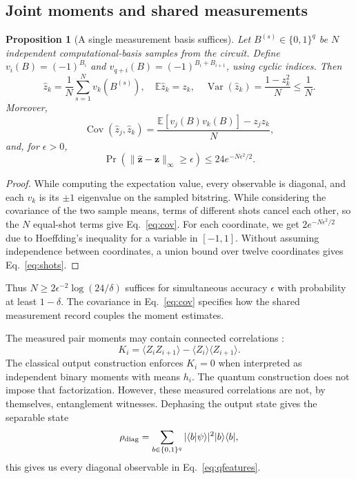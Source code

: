\documentclass[10pt,a4paper]{article}
\newtheorem{proposition}{Proposition}
\newcommand{\E}{\mathbb{E}}
\newcommand{\Var}{\operatorname{Var}}
\newcommand{\Cov}{\operatorname{Cov}}
\newcommand{\ket}[1]{\lvert #1\rangle}
\newcommand{\bra}[1]{\langle #1\rvert}
\newcommand{\norm}[1]{\lVert #1\rVert}
\begin{document}
\subsection{Joint moments and shared measurements}
\begin{proposition}[A single measurement basis suffices]\label{prop:shots}
Let $B^{(s)}\in\{0,1\}^{q}$ be $N$ independent computational-basis samples from the circuit. Define $v_i(B)=(-1)^{B_i}$ and $v_{q+i}(B)=(-1)^{B_i+B_{i+1}}$, using cyclic indices. Then
\begin{equation}
\widehat z_k=\frac1N\sum_{s=1}^{N}v_k(B^{(s)}),\quad
\E\widehat z_k=z_k,\quad
\Var(\widehat z_k)=\frac{1-z_k^2}{N}\leq\frac1N.
\end{equation}
Moreover,
\begin{equation}\label{eq:cov}
\Cov(\widehat z_j,\widehat z_k)
=\frac{\E[v_j(B)v_k(B)]-z_jz_k}{N},
\end{equation}
and, for $\epsilon>0$,
\begin{equation}\label{eq:shots}
\Pr\!\left(\norm{\widehat{\mathbf z}-\mathbf z}_\infty\geq\epsilon\right)
\leq24e^{-N\epsilon^2/2}.
\end{equation}
\end{proposition}
\begin{proof}


While computing the expectation value, every observable is diagonal, and each $v_k$ is its $\pm1$ eigenvalue on the sampled bitstring. While considering the covariance of the two sample means, terms of different shots cancel each other, so the $N$ equal-shot terms give Eq.~\eqref{eq:cov}. For each coordinate, we get $2e^{-N\epsilon^2/2}$ due to Hoeffding's inequality for a variable in $[-1,1]$. Without assuming independence between coordinates, a union bound over twelve coordinates gives Eq.~\eqref{eq:shots}.
\end{proof}

Thus $N\geq2\epsilon^{-2}\log(24/\delta)$ suffices for simultaneous accuracy $\epsilon$ with probability at least $1-\delta$. The covariance in Eq.~\eqref{eq:cov} specifies how the shared measurement record couples the moment estimates.

The measured pair moments may contain connected correlations
: \begin{equation}
K_i=\langle Z_iZ_{i+1}\rangle-\langle Z_i\rangle\langle Z_{i+1}\rangle.
\end{equation}
The classical output construction enforces $K_i=0$ when interpreted as independent binary moments with means $h_i$. The quantum construction does not impose that factorization. However, these measured correlations are not, by themselves, entanglement witnesses. Dephasing the output state gives the separable state
\begin{equation}
\rho_{\rm diag}=\sum_{b\in\{0,1\}^{q}}|\langle b|\psi\rangle|^2\ket b\bra b,
\end{equation}
this gives us every diagonal observable in Eq.~\eqref{eq:qfeatures}. 
\end{document}
